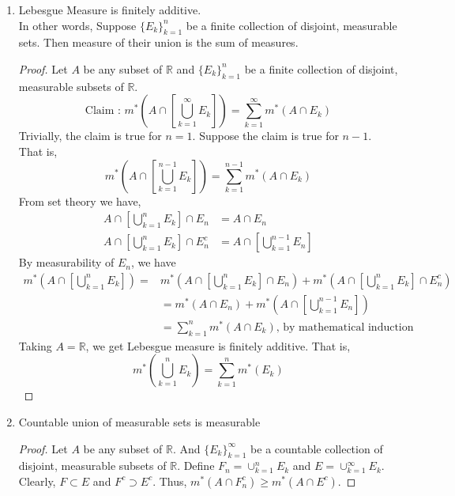 \begin{enumerate}
	\item Lebesgue Measure is finitely additive.\\
		In other words, Suppose $\{E_k\}_{k = 1}^n$ be a finite collection of disjoint, measurable sets. Then measure of their union is the sum of measures.
	\begin{proof}
	Let $A$ be any subset of $\mathbb{R}$ and $\{ E_k \}_{k=1}^n$ be a finite collection of disjoint, measurable subsets of $\mathbb{R}$.
	\begin{equation}
		\text{Claim : }	m^\ast \left( A \cap \left[ \bigcup_{k=1}^\infty E_k\right] \right) = \sum_{k=1}^\infty m^\ast (A \cap E_k)
	\end{equation}
	Trivially, the claim is true for $n=1$. Suppose the claim is true for $n-1$. That is,
	\begin{equation}
		m^\ast \left( A \cap \left[ \bigcup_{k=1}^{n-1} E_k \right] \right) = \sum_{k=1}^{n-1} m^\ast (A \cap E_k)
	\end{equation}
	From set theory we have,
	\begin{align}
		A \cap \left[ \bigcup_{k=1}^n E_k \right] \cap E_n & = A \cap E_n\\
		A \cap \left[ \bigcup_{k=1}^n E_k \right] \cap E_n^c  & = A \cap \left[ \bigcup_{k=1}^{n-1} E_n \right]
	\end{align}
	By measurability of $E_n$, we have
	\begin{align*}
		m^\ast \left( A \cap \left[ \bigcup_{k=1}^n E_k \right] \right) = & m^\ast \left( A \cap \left[ \bigcup_{k=1}^n E_k \right] \cap E_n \right) + m^\ast \left( A \cap \left[ \bigcup_{k=1}^n E_k \right] \cap E_n^c \right)\\
		& = m^\ast \left( A \cap E_n \right) + m^\ast  \left( A \cap \left[ \bigcup_{k=1}^{n-1} E_n \right] \right) \\
		& =  \sum_{k=1}^n m^\ast \left( A \cap E_k \right) \text{, by mathematical induction}
	\end{align*}
	Taking $A = \mathbb{R}$, we get Lebesgue measure is finitely additive. That is,
	\begin{equation}
		m^\ast \left( \bigcup_{k=1}^n E_k \right) = \sum_{k=1}^n m^\ast \left( E_k \right)
	\end{equation}
	\end{proof}
	\item Countable union of measurable sets is measurable
	\begin{proof}
		Let $A$ be any subset of $\mathbb{R}$. And $\{ E_k \}_{k=1}^\infty$ be a countable collection of disjoint, measurable subsets of $\mathbb{R}$. Define $F_n = \cup_{k=1}^n E_k$ and $E = \cup_{k=1}^\infty E_k$. Clearly, $F \subset E$ and $F^c \supset E^c$. Thus, $m^\ast(A \cap F_n^c) \ge m^\ast(A \cap E^c)$.

\end{proof}
\end{enumerate}
